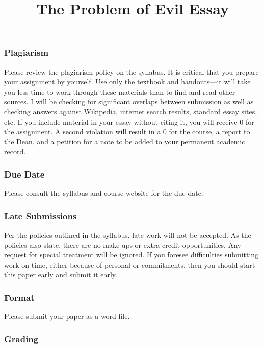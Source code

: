\documentclass[]{article}
\title{The Problem of Evil Essay}
\date{}
\begin{document}
\maketitle

\subsubsection{Plagiarism}\label{plagiarism}

Please review the plagiarism policy on the syllabus. It is critical that
you prepare your assignment by yourself. Use only the textbook and
handouts---it will take you less time to work through these materials
than to find and read other sources. I will be checking for significant
overlaps between submission as well as checking answers against
Wikipedia, internet search results, standard essay sites, etc. If you
include material in your essay without citing it, you will receive 0 for
the assignment. A second violation will result in a 0 for the course, a
report to the Dean, and a petition for a note to be added to your
permanent academic record.

\subsubsection{Due Date}\label{due-date}

Please consult the syllabus and course website for the due date.

\subsubsection{Late Submissions}\label{late-submissions}

Per the policies outlined in the syllabus, late work will not be
accepted. As the policies also state, there are no make-ups or extra
credit opportunities. Any request for special treatment will be ignored.
If you foresee difficulties submitting work on time, either because of
personal or commitments, then you should start this paper early and
submit it early.

\subsubsection{Format}\label{format}

Please submit your paper as a word file.

\subsubsection{Grading}\label{grading}
\end{document}
